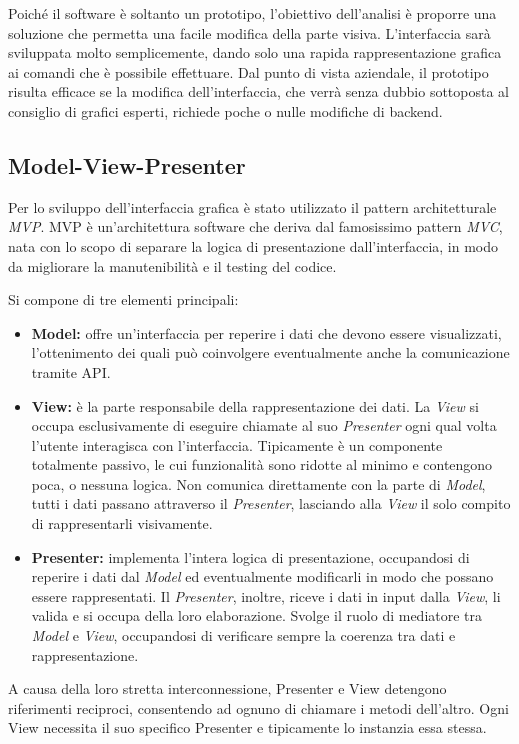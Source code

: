 \documentclass[12pt,a4paper,openright,twoside]{book}
\newcommand{\itemdef}[1]{\item \textbf{#1}}
\begin{document}
Poiché il software è soltanto un prototipo, l'obiettivo dell'analisi è proporre una soluzione che permetta una facile modifica della parte visiva.
L'interfaccia sarà sviluppata molto semplicemente, dando solo una rapida rappresentazione grafica ai comandi che è possibile effettuare.
Dal punto di vista aziendale, il prototipo risulta efficace se la modifica dell'interfaccia, che verrà senza dubbio sottoposta al consiglio di grafici esperti, richiede poche o nulle modifiche di backend.

\subsection{Model-View-Presenter}
\label{ssec:analisi-mvp}

Per lo sviluppo dell'interfaccia grafica è stato utilizzato il pattern architetturale \textit{\gls{MVP}}.
\gls{MVP} è un'architettura software che deriva dal famosissimo pattern \textit{\gls{MVC}}, nata con lo scopo di separare la logica di presentazione dall'interfaccia, in modo da migliorare la manutenibilità e il testing del codice.

Si compone di tre elementi principali:
\begin{itemize}
	\itemdef{Model:}
	offre un'interfaccia per reperire i dati che devono essere visualizzati, l'ottenimento dei quali può coinvolgere eventualmente anche la comunicazione tramite API.
	
	\itemdef{View:}
	è la parte responsabile della rappresentazione dei dati.
	La \textit{View} si occupa esclusivamente di eseguire chiamate al suo \textit{Presenter} ogni qual volta l'utente interagisca con l'interfaccia.
	Tipicamente è un componente totalmente passivo, le cui funzionalità sono ridotte al minimo e contengono poca, o nessuna logica.
	Non comunica direttamente con la parte di \textit{Model}, tutti i dati passano attraverso il \textit{Presenter}, lasciando alla \textit{View} il solo compito di rappresentarli visivamente.
	
	\itemdef{Presenter:} implementa l'intera logica di presentazione, occupandosi
	di reperire i dati dal \textit{Model} ed eventualmente modificarli in modo che
	possano essere rappresentati.
	Il \textit{Presenter}, inoltre, riceve i dati in input dalla \textit{View}, li valida e si occupa della loro elaborazione.
	Svolge il ruolo di mediatore tra \textit{Model} e \textit{View}, occupandosi di verificare sempre la coerenza tra dati e rappresentazione.
\end{itemize}
A causa della loro stretta interconnessione, Presenter e View detengono riferimenti reciproci, consentendo ad ognuno di chiamare i metodi dell'altro.
Ogni View necessita il suo specifico Presenter e tipicamente lo instanzia essa stessa.
\end{document}

